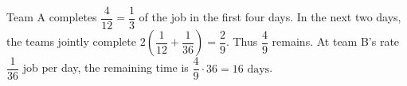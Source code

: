 Team A completes $\dfrac{4}{12}=\dfrac{1}{3}$ of the job in the first four days. In the next two days, the teams jointly complete $2(\dfrac{1}{12}+\dfrac{1}{36})=\dfrac{2}{9}$. Thus $\dfrac{4}{9}$ remains. At team B's rate $\dfrac{1}{36}$ job per day, the remaining time is $\dfrac{4}{9}\cdot36=\boxed{16\text{ days}}$.
